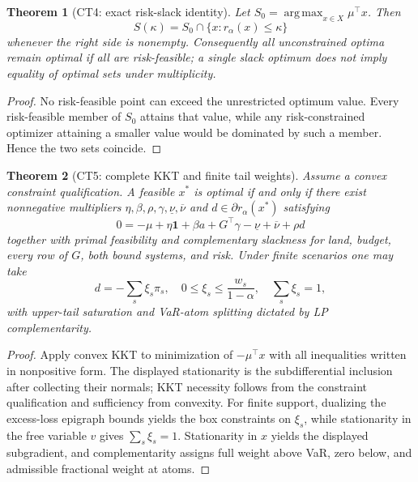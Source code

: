 \documentclass[11pt]{article}
\newtheorem{theorem}{Theorem}
\theoremstyle{definition}
\newcommand{\argmax}{\operatorname*{arg\,max}}
\begin{document}
\begin{theorem}[CT4: exact risk-slack identity]\label{ct4}
Let $S_0=\argmax_{x\in X}\mu^\top x$.  Then
\[
S(\kappa)=S_0\cap\{x:r_\alpha(x)\le\kappa\}
\]
whenever the right side is nonempty.  Consequently all unconstrained
optima remain optimal if all are risk-feasible; a single slack optimum
does not imply equality of optimal sets under multiplicity.
\end{theorem}
\begin{proof}
No risk-feasible point can exceed the unrestricted optimum value.
Every risk-feasible member of $S_0$ attains that value, while any
risk-constrained optimizer attaining a smaller value would be dominated by
such a member.  Hence the two sets coincide.
\end{proof}

\begin{theorem}[CT5: complete KKT and finite tail weights]\label{ct5}
Assume a convex constraint qualification.  A feasible $x^*$ is optimal
if and only if there exist nonnegative multipliers
$\eta,\beta,\rho,\gamma,\underline\nu,\overline\nu$ and
$d\in\partial r_\alpha(x^*)$ satisfying
\[
0=-\mu+\eta\mathbf1+\beta a+G^\top\gamma
-\underline\nu+\overline\nu+\rho d
\]
together with primal feasibility and complementary slackness for land,
budget, every row of $G$, both bound systems, and risk.  Under finite
scenarios one may take
\[
d=-\sum_s\xi_s\pi_s,\quad
0\le\xi_s\le\frac{w_s}{1-\alpha},\quad \sum_s\xi_s=1,
\]
with upper-tail saturation and VaR-atom splitting dictated by LP
complementarity.
\end{theorem}
\begin{proof}
Apply convex KKT to minimization of $-\mu^\top x$ with all inequalities
written in nonpositive form.  The displayed stationarity is the
subdifferential inclusion after collecting their normals; KKT necessity
follows from the constraint qualification and sufficiency from convexity.
For finite support, dualizing the excess-loss epigraph bounds yields the
box constraints on $\xi_s$, while stationarity in the free variable $v$
gives $\sum_s\xi_s=1$.  Stationarity in $x$ yields the displayed
subgradient, and complementarity assigns full weight above VaR, zero below,
and admissible fractional weight at atoms.
\end{proof}
\end{document}
